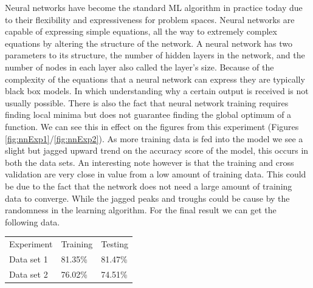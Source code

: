 \documentclass[
	letterpaper, %
]{IEEEtran}
\begin{document}
		Neural networks have become the standard ML algorithm in practice today due to their flexibility and expressiveness for problem spaces. Neural networks are capable of expressing simple equations, all the way to extremely complex equations by altering the structure of the network. A neural network has two parameters to its structure, the number of hidden layers in the network, and the number of nodes in each layer also called the layer's size. Because of the complexity of the equations that a neural network can express they are typically black box models. In which understanding why a certain output is received is not usually possible. There is also the fact that neural network training requires finding local minima but does not guarantee finding the global optimum of a function. We can see this in effect on the figures from this experiment (Figures \ref{fig:nnExp1}/\ref{fig:nnExp2}). As more training data is fed into the model we see a slight but jagged upward trend on the accuracy score of the model, this occurs in both the data sets. An interesting note however is that the training and cross validation are very close in value from a low amount of training data. This could be due to the fact that the network does not need a large amount of training data to converge. While the jagged peaks and troughs could be cause by the randomness in the learning algorithm. For the final result we can get the following data.
		
		\begin{center}
			\begin{table}[h]
				\begin{tabular}{lll}
					Experiment & Training & Testing \\
					Data set 1 & 81.35\% & 81.47\% \\
					Data set 2 & 76.02\% & 74.51\%
				\end{tabular}
			\end{table}
		\end{center}
	
\end{document}
